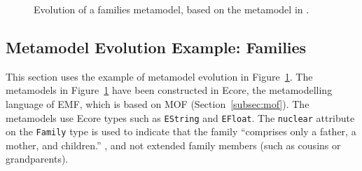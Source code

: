 \begin{figure}[htbp]
	\centering
	\caption{Evolution of a families metamodel, based on the metamodel in \cite{hutn}.}
\label{fig:families_mms}
\end{figure}

\subsection{Metamodel Evolution Example: Families}
\label{subsec:families_example}
This section uses the example of metamodel evolution in Figure~\ref{fig:families_mms}. The metamodels in Figure~\ref{fig:families_mms} have been constructed in Ecore, the metamodelling language of EMF, which is based on MOF (Section~\ref{subsec:mof}). The metamodels use Ecore types such as \texttt{ESt\-ri\-ng} and \texttt{EFlo\-at}. The \texttt{nu\-cl\-e\-ar} attribute on the \texttt{Fa\-mi\-ly} type is used to indicate that the family ``comprises only a father, a mother, and children.'' \cite{nucleardef}, and not extended family members (such as cousins or grandparents).

